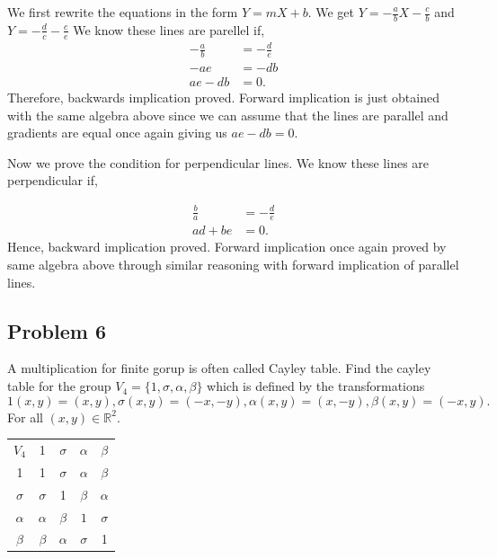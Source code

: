 \begin{solution}
  We first rewrite the equations in the form \( Y = mX + b \).
  We get \( Y = -\frac{a}{b}X - \frac{c}{b} \) and \( Y  = -\frac{d}{c} - \frac{c}{e}\)
  We know these lines are parellel if,
  \begin{align*}
    -\frac{a}{b} &= -\frac{d}{e} \\
    -ae &= -db \\
    ae - db &= 0
  .\end{align*}
  Therefore, backwards implication proved. Forward implication is just obtained 
  with the same algebra above since we can assume that the lines are parallel and gradients are equal once again giving us \( ae - db = 0 \).

  Now we prove the condition for perpendicular lines. We know these lines
  are perpendicular if,

  \begin{align*}
    \frac{b}{a} &= -\frac{d}{e} \\
  ad + be &= 0 
  .\end{align*}
  Hence, backward implication proved. Forward implication
  once again proved by same algebra above through similar reasoning with
  forward implication of parallel lines.
\end{solution}

\subsection{Problem 6}
A multiplication for finite gorup is often called Cayley table. Find the cayley table for the group \( V_{4} = \{1, \sigma , \alpha , \beta \}  \) which
is defined by the transformations
\[
  1 \left( x,y \right) = \left( x,y \right), \sigma \left( x, y \right) = \left( -x, -y \right), \alpha \left(x, y  \right) = \left(x, -y  \right), \beta \left( x,y \right) = \left( -x,y \right)
.\] 
For all \( \left( x,y \right) \in \mathbb{R}^{2} \).

\begin{solution}

  \begin{tabular}{ c c c c c }
    \( V_{4} \) & 1 & \( \sigma  \) & \( \alpha  \) & \( \beta  \) \\
    1 & 1 & \( \sigma  \) & \( \alpha  \) & \( \beta  \) \\
  \( \sigma  \) & \( \sigma  \) & 1 & \( \beta  \) & \( \alpha  \) \\
  \( \alpha  \) & \( \alpha   \) & \( \beta   \) & \(1  \) & \( \sigma  \) \\
  \( \beta  \) & \( \beta  \) & \( \alpha   \)& \( \sigma  \) & 1
   
  \end{tabular}

\end{solution}

